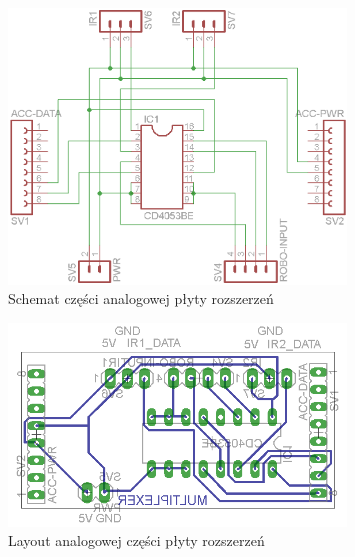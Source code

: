 \begin{figure}[!ht]
 \centering
 \includegraphics[width=0.8\textwidth]{../images/ch04/adcmultiplexer-sch.png}
 \caption{Schemat części analogowej płyty rozszerzeń}
 \label{fig:AdcMultiplexerSch}
\end{figure}

\begin{figure}[!ht]
 \centering
 \includegraphics[width=0.8\textwidth]{../images/ch04/adcmultiplexer-brd.png}
 \caption{Layout analogowej części płyty rozszerzeń}
 \label{fig:AdcMultiplexerPCB}
\end{figure}
